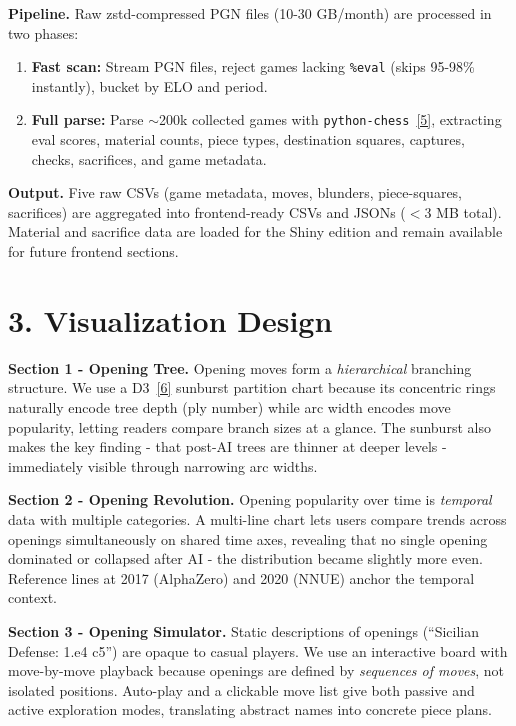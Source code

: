 \documentclass[a4paper]{article}
\begin{document}
\textbf{Pipeline.}
Raw zstd-compressed PGN files (10-30 GB/month) are processed in two phases:
\begin{enumerate}[itemsep=0.25em, topsep=0.25em]
  \item \textbf{Fast scan:} Stream PGN files, reject games lacking \texttt{\%eval} (skips 95-98\% instantly), bucket by ELO and period.
  \item \textbf{Full parse:} Parse $\sim$200k collected games with \texttt{python-chess}~\hyperlink{ref5}{[5]}, extracting eval scores, material counts, piece types, destination squares, captures, checks, sacrifices, and game metadata.
\end{enumerate}

\textbf{Output.}
Five raw CSVs (game metadata, moves, blunders, piece-squares, sacrifices) are aggregated into frontend-ready CSVs and JSONs ($<$3 MB total). Material and sacrifice data are loaded for the Shiny edition and remain available for future frontend sections.

\section*{3. Visualization Design}

\textbf{Section 1 - Opening Tree.}
Opening moves form a \emph{hierarchical} branching structure. We use a D3~\hyperlink{ref6}{[6]} sunburst partition chart because its concentric rings naturally encode tree depth (ply number) while arc width encodes move popularity, letting readers compare branch sizes at a glance. The sunburst also makes the key finding - that post-AI trees are thinner at deeper levels - immediately visible through narrowing arc widths.

\textbf{Section 2 - Opening Revolution.}
Opening popularity over time is \emph{temporal} data with multiple categories. A multi-line chart lets users compare trends across openings simultaneously on shared time axes, revealing that no single opening dominated or collapsed after AI - the distribution became slightly more even. Reference lines at 2017 (AlphaZero) and 2020 (NNUE) anchor the temporal context.

\textbf{Section 3 - Opening Simulator.}
Static descriptions of openings (``Sicilian Defense: 1.e4 c5'') are opaque to casual players. We use an interactive board with move-by-move playback because openings are defined by \emph{sequences of moves}, not isolated positions. Auto-play and a clickable move list give both passive and active exploration modes, translating abstract names into concrete piece plans.
\end{document}
